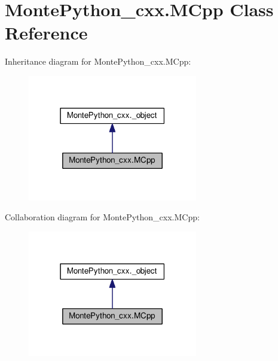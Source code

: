 \hypertarget{classMontePython__cxx_1_1MCpp}{}\section{Monte\+Python\+\_\+cxx.\+M\+Cpp Class Reference}
\label{classMontePython__cxx_1_1MCpp}


Inheritance diagram for Monte\+Python\+\_\+cxx.\+M\+Cpp\+:
\nopagebreak
\begin{figure}[H]
\begin{center}
\leavevmode
\includegraphics[width=210pt]{classMontePython__cxx_1_1MCpp__inherit__graph}
\end{center}
\end{figure}


Collaboration diagram for Monte\+Python\+\_\+cxx.\+M\+Cpp\+:
\nopagebreak
\begin{figure}[H]
\begin{center}
\leavevmode
\includegraphics[width=210pt]{classMontePython__cxx_1_1MCpp__coll__graph}
\end{center}
\end{figure}
